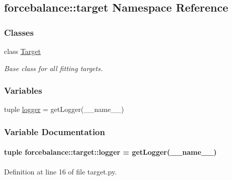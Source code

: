\hypertarget{namespaceforcebalance_1_1target}{\subsection{forcebalance\-:\-:target \-Namespace \-Reference}
\label{namespaceforcebalance_1_1target}
}
\subsubsection*{\-Classes}
\begin{DoxyCompactItemize}
\item 
class \hyperlink{classforcebalance_1_1target_1_1Target}{\-Target}
\begin{DoxyCompactList}\small\item\em \-Base class for all fitting targets. \end{DoxyCompactList}\end{DoxyCompactItemize}
\subsubsection*{\-Variables}
\begin{DoxyCompactItemize}
\item 
tuple \hyperlink{namespaceforcebalance_1_1target_a6b5ddff6e409717872f8dbdb243183eb}{logger} = get\-Logger(\-\_\-\-\_\-name\-\_\-\-\_\-)
\end{DoxyCompactItemize}


\subsubsection{\-Variable \-Documentation}
\hypertarget{namespaceforcebalance_1_1target_a6b5ddff6e409717872f8dbdb243183eb}{
\paragraph[{logger}]{\setlength{\rightskip}{0pt plus 5cm}tuple {\bf forcebalance\-::target\-::logger} = get\-Logger(\-\_\-\-\_\-name\-\_\-\-\_\-)}}\label{namespaceforcebalance_1_1target_a6b5ddff6e409717872f8dbdb243183eb}


\-Definition at line 16 of file target.\-py.

